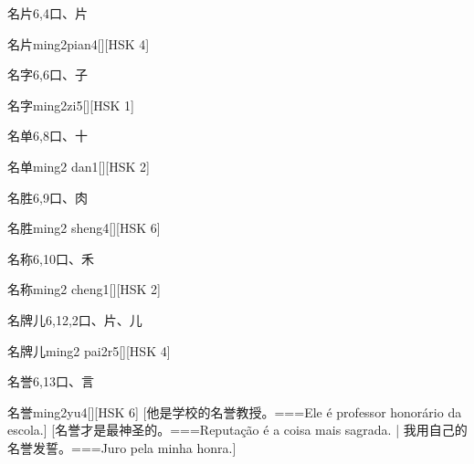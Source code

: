 \begin{Entry}{名片}{6,4}{⼝、⽚}
  \begin{Phonetics}{名片}{ming2pian4}[][HSK 4]
  \end{Phonetics}
\end{Entry}

\begin{Entry}{名字}{6,6}{⼝、⼦}
  \begin{Phonetics}{名字}{ming2zi5}[][HSK 1]
  \end{Phonetics}
\end{Entry}

\begin{Entry}{名单}{6,8}{⼝、⼗}
  \begin{Phonetics}{名单}{ming2 dan1}[][HSK 2]
  \end{Phonetics}
\end{Entry}

\begin{Entry}{名胜}{6,9}{⼝、⾁}
  \begin{Phonetics}{名胜}{ming2 sheng4}[][HSK 6]
  \end{Phonetics}
\end{Entry}

\begin{Entry}{名称}{6,10}{⼝、⽲}
  \begin{Phonetics}{名称}{ming2 cheng1}[][HSK 2]
  \end{Phonetics}
\end{Entry}

\begin{Entry}{名牌儿}{6,12,2}{⼝、⽚、⼉}
  \begin{Phonetics}{名牌儿}{ming2 pai2r5}[][HSK 4]
  \end{Phonetics}
\end{Entry}

\begin{Entry}{名誉}{6,13}{⼝、⾔}
  \begin{Phonetics}{名誉}{ming2yu4}[][HSK 6]
    [他是学校的名誉教授。===Ele é professor honorário da escola.]
    [名誉才是最神圣的。===Reputação é a coisa mais sagrada. | 我用自己的名誉发誓。===Juro pela minha honra.]
  \end{Phonetics}
\end{Entry}

